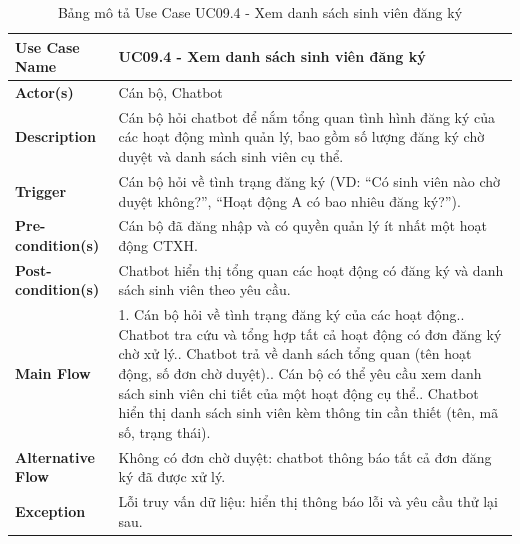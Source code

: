\begin{table}[H]
	\centering
	\renewcommand{\arraystretch}{1.25}
	\begin{tabular}{|p{3.8cm}|p{11.2cm}|}
		\hline
		\textbf{Use Case Name} & \textbf{UC09.4 - Xem danh sách sinh viên đăng ký} \\ \hline
		\textbf{Actor(s)} & Cán bộ, Chatbot \\ \hline
		\textbf{Description} & Cán bộ hỏi chatbot để nắm tổng quan tình hình đăng ký của các hoạt động mình quản lý, bao gồm số lượng đăng ký chờ duyệt và danh sách sinh viên cụ thể. \\ \hline
		\textbf{Trigger} & Cán bộ hỏi về tình trạng đăng ký (VD: ``Có sinh viên nào chờ duyệt không?'', ``Hoạt động A có bao nhiêu đăng ký?''). \\ \hline
		\textbf{Pre-condition(s)} & Cán bộ đã đăng nhập và có quyền quản lý ít nhất một hoạt động CTXH. \\ \hline
		\textbf{Post-condition(s)} & Chatbot hiển thị tổng quan các hoạt động có đăng ký và danh sách sinh viên theo yêu cầu. \\ \hline
		\textbf{Main Flow} &
		1. Cán bộ hỏi về tình trạng đăng ký của các hoạt động.\newline
		2. Chatbot tra cứu và tổng hợp tất cả hoạt động có đơn đăng ký chờ xử lý.\newline
		3. Chatbot trả về danh sách tổng quan (tên hoạt động, số đơn chờ duyệt).\newline
		4. Cán bộ có thể yêu cầu xem danh sách sinh viên chi tiết của một hoạt động cụ thể.\newline
		5. Chatbot hiển thị danh sách sinh viên kèm thông tin cần thiết (tên, mã số, trạng thái). \\ \hline
		\textbf{Alternative Flow} & Không có đơn chờ duyệt: chatbot thông báo tất cả đơn đăng ký đã được xử lý. \\ \hline
		\textbf{Exception} & Lỗi truy vấn dữ liệu: hiển thị thông báo lỗi và yêu cầu thử lại sau. \\ \hline
	\end{tabular}
	\caption{Bảng mô tả Use Case UC09.4 - Xem danh sách sinh viên đăng ký}
\end{table}

